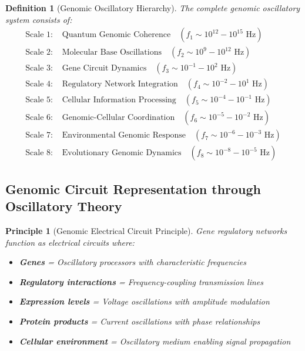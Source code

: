 \documentclass[12pt,a4paper]{article}
\newtheorem{definition}{Definition}
\newtheorem{principle}{Principle}
\begin{document}
\begin{definition}[Genomic Oscillatory Hierarchy]
The complete genomic oscillatory system consists of:
\begin{align}
\text{Scale 1: } &\text{Quantum Genomic Coherence} \quad (f_1 \sim 10^{12}-10^{15} \text{ Hz}) \label{eq:quantum_genomic} \\
\text{Scale 2: } &\text{Molecular Base Oscillations} \quad (f_2 \sim 10^9-10^{12} \text{ Hz}) \label{eq:molecular_base} \\
\text{Scale 3: } &\text{Gene Circuit Dynamics} \quad (f_3 \sim 10^{-1}-10^2 \text{ Hz}) \label{eq:gene_circuit} \\
\text{Scale 4: } &\text{Regulatory Network Integration} \quad (f_4 \sim 10^{-2}-10^1 \text{ Hz}) \label{eq:regulatory_network} \\
\text{Scale 5: } &\text{Cellular Information Processing} \quad (f_5 \sim 10^{-4}-10^{-1} \text{ Hz}) \label{eq:cellular_info} \\
\text{Scale 6: } &\text{Genomic-Cellular Coordination} \quad (f_6 \sim 10^{-5}-10^{-2} \text{ Hz}) \label{eq:genomic_cellular} \\
\text{Scale 7: } &\text{Environmental Genomic Response} \quad (f_7 \sim 10^{-6}-10^{-3} \text{ Hz}) \label{eq:environmental_genomic} \\
\text{Scale 8: } &\text{Evolutionary Genomic Dynamics} \quad (f_8 \sim 10^{-8}-10^{-5} \text{ Hz}) \label{eq:evolutionary_genomic}
\end{align}
\end{definition}

\subsection{Genomic Circuit Representation through Oscillatory Theory}

\begin{principle}[Genomic Electrical Circuit Principle]
Gene regulatory networks function as electrical circuits where:
\begin{itemize}
\item \textbf{Genes} = Oscillatory processors with characteristic frequencies
\item \textbf{Regulatory interactions} = Frequency-coupling transmission lines
\item \textbf{Expression levels} = Voltage oscillations with amplitude modulation
\item \textbf{Protein products} = Current oscillations with phase relationships
\item \textbf{Cellular environment} = Oscillatory medium enabling signal propagation
\end{itemize}
\end{principle}
\end{document}
